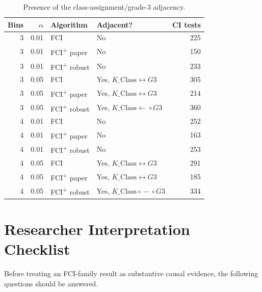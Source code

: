 \documentclass[11pt,a4paper,oneside]{report}
\newcommand{\FCIplus}{FCI\textsuperscript{+}}
\begin{document}
\begin{table}[H]
\centering
\caption{Presence of the class-assignment/grade-3 adjacency.}
\begin{tabular}{rrlp{}r}
\toprule
Bins & \(\alpha\) & Algorithm & Adjacent? & CI tests \\
\midrule
3 & 0.01 & FCI & No & 225 \\
3 & 0.01 & \FCIplus{} paper & No & 150 \\
3 & 0.01 & \FCIplus{} robust & No & 233 \\
3 & 0.05 & FCI & Yes, \(K\_\mathrm{Class}\leftrightarrow G3\) & 305 \\
3 & 0.05 & \FCIplus{} paper & Yes, \(K\_\mathrm{Class}\leftrightarrow G3\) & 214 \\
3 & 0.05 & \FCIplus{} robust &
Yes, \(K\_\mathrm{Class}\leftarrow\!\circ G3\) & 360 \\
4 & 0.01 & FCI & No & 252 \\
4 & 0.01 & \FCIplus{} paper & No & 163 \\
4 & 0.01 & \FCIplus{} robust & No & 253 \\
4 & 0.05 & FCI & Yes, \(K\_\mathrm{Class}\leftrightarrow G3\) & 291 \\
4 & 0.05 & \FCIplus{} paper & Yes, \(K\_\mathrm{Class}\leftrightarrow G3\) & 185 \\
4 & 0.05 & \FCIplus{} robust &
Yes, \(K\_\mathrm{Class}\circ\!-\!\circ G3\) & 334 \\
\bottomrule
\end{tabular}
\end{table}

\chapter{Researcher Interpretation Checklist}

Before treating an FCI-family result as substantive causal evidence, the
following questions should be answered.
\end{document}
